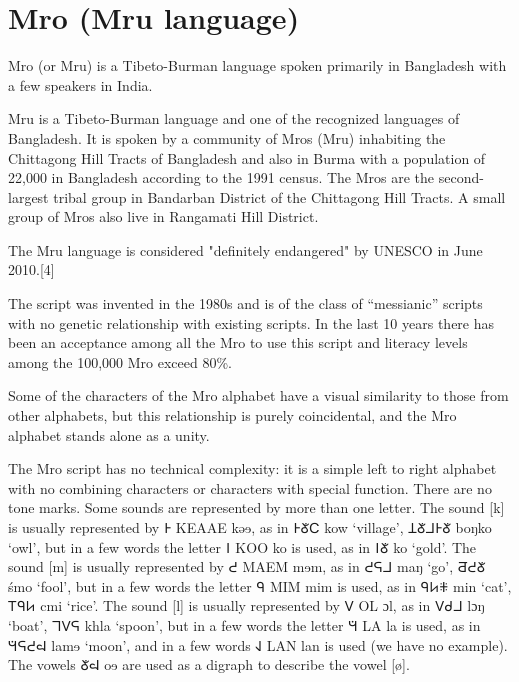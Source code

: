 \section{Mro (Mru language)}
\label{s:mro}

\newfontfamily{}
\def\textmro#1{{\mro #1\xspace}}

 Mro (or Mru) is a Tibeto-Burman language spoken primarily in Bangladesh with a few
speakers in India. 

Mru is a Tibeto-Burman language and one of the recognized languages of Bangladesh. It is spoken by a community of Mros (Mru) inhabiting the Chittagong Hill Tracts of Bangladesh and also in Burma with a population of 22,000 in Bangladesh according to the 1991 census. The Mros are the second-largest tribal group in Bandarban District of the Chittagong Hill Tracts. A small group of Mros also live in Rangamati Hill District.

The Mru language is considered "definitely endangered" by UNESCO in June 2010.[4]

The script was invented in the 1980s and is of the class of “messianic”
scripts with no genetic relationship with existing scripts. In the last 10 years there has been an acceptance
among all the Mro to use this script and literacy levels among the 100,000 Mro exceed 80\%.

Some of the characters of the Mro alphabet have a visual similarity to those from other alphabets, but this
relationship is purely coincidental, and the Mro alphabet stands alone as a unity.


The Mro script has no technical complexity: it is a simple left to right alphabet with no
combining characters or characters with special function. There are no tone marks. Some sounds are
represented by more than one letter. The sound [k] is usually represented by \textmro{𖩌} KEAAE kəɘ, as in \textmro{𖩌𖩑𖩗} kow
‘village’, \textmro{𖩄𖩑𖩁𖩌𖩑} boŋko ‘owl’, but in a few words the letter 𖩙 KOO ko is used, as in \textmro{𖩙𖩑} ko ‘gold’. The sound
[m] is usually represented by \textmro{𖩎} MAEM mɘm, as in \textmro{𖩎𖩆𖩁} maŋ ‘go’, \textmro{𖩔𖩎𖩑} śmo ‘fool’, but in a few words the
letter \textmro{𖩃} MIM mim is used, as in \textmro{𖩃𖩊𖩏} min ‘cat’, \textmro{𖩋𖩃𖩊} cmi ‘rice’. The sound [l] is usually represented by \textmro{𖩍} OL
\textmro{ɔl}, as in \textmro{𖩍𖩝𖩁} lɔŋ ‘boat’, \textmro{𖩈𖩍𖩆} khla ‘spoon’, but in a few words the letter \textmro{𖩛} LA la is used, as in \textmro{𖩛𖩆𖩎𖩖} lamɘ
‘moon’, and in a few words \textmro{𖩚} LAN lan is used (we have no example). The vowels \textmro{𖩑𖩖} oɘ are used as a
digraph to describe the vowel [ø].

